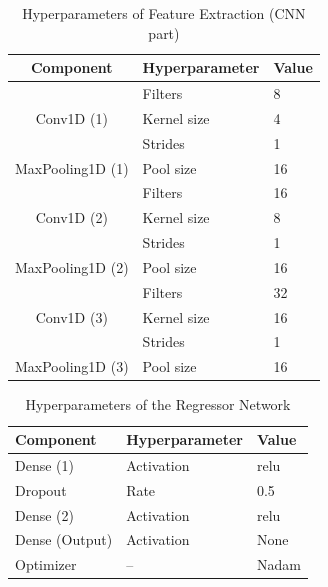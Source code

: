 \documentclass[10pt,conference]{IEEEtran}
\begin{document}
\begin{table} \small \centering
  \caption{Hyperparameters of Feature Extraction (CNN part)}
  \label{tab:hyperparams_cnn}
  \begin{tabular}{cll}
    \toprule
    Component & Hyperparameter & Value \\
    \midrule
    \multirow{3}{*}{Conv1D (1)} 
        & Filters & 8 \\
        & Kernel size & 4 \\
        & Strides & 1 \\
    MaxPooling1D (1) & Pool size & 16 \\
    \multirow{3}{*}{Conv1D (2)} 
        & Filters & 16 \\
        & Kernel size & 8 \\
        & Strides & 1 \\
    MaxPooling1D (2) & Pool size & 16 \\
    \multirow{3}{*}{Conv1D (3)} 
        & Filters & 32 \\
        & Kernel size & 16 \\
        & Strides & 1 \\
    MaxPooling1D (3) & Pool size & 16 \\
    \bottomrule
  \end{tabular}
\end{table}


\begin{table} \small \centering
  \caption{Hyperparameters of the Regressor Network}
  \label{tab:hyperparams_regressor}
  \begin{tabular}{lll}
    \toprule
    Component & Hyperparameter & Value \\
    \midrule
    \multirow{1}{*}{Dense (1)} 
        & Activation & relu \\
    Dropout & Rate & 0.5 \\
    \multirow{1}{*}{Dense (2)} 
        & Activation & relu \\
    \multirow{1}{*}{Dense (Output)} 
        & Activation & None \\
    Optimizer & -- & Nadam \\
    \bottomrule
  \end{tabular}
\end{table}


\end{document}
